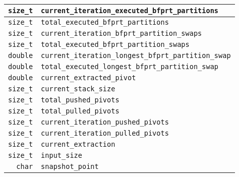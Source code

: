 \begin{table}[!ht]
\begin{tabularx}{\linewidth}{|r|X|}
    \hline
    \texttt{size\_t} & \texttt{current\_iteration\_executed\_bfprt\_partitions} \\ %
    \hline
    \texttt{size\_t} & \texttt{total\_executed\_bfprt\_partitions} \\ %
    \hline
    \texttt{size\_t} & \texttt{current\_iteration\_bfprt\_partition\_swaps} \\ %
    \hline
    \texttt{size\_t} & \texttt{total\_executed\_bfprt\_partition\_swaps} \\ %
    \hline
    \texttt{double} & \texttt{current\_iteration\_longest\_bfprt\_partition\_swap} \\ %
    \hline
    \texttt{double} & \texttt{total\_executed\_longest\_bfprt\_partition\_swap} \\ %
    \hline
    \texttt{double} & \texttt{current\_extracted\_pivot} \\ %
    \hline
    \texttt{size\_t} & \texttt{current\_stack\_size} \\ %
    \hline
    \texttt{size\_t} & \texttt{total\_pushed\_pivots} \\ %
    \hline
    \texttt{size\_t} & \texttt{total\_pulled\_pivots} \\ %
    \hline
    \texttt{size\_t} & \texttt{current\_iteration\_pushed\_pivots} \\ %
    \hline
    \texttt{size\_t} & \texttt{current\_iteration\_pulled\_pivots} \\ %
    \hline
    \texttt{size\_t} & \texttt{current\_extraction} \\ %
    \hline
    \texttt{size\_t} & \texttt{input\_size} \\ %
    \hline
    \texttt{char} & \texttt{snapshot\_point} \\ %
    \hline
\end{tabularx}
\label{TABLE:SNAPSHOT_STRUCTURE}
\end{table}


